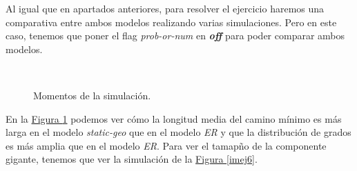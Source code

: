 \documentclass[paper=a4, fontsize=11pt]{article} %
\numberwithin{equation}{section} %
\numberwithin{figure}{section} %
\numberwithin{table}{section} %
\begin{document}
Al igual que en apartados anteriores, para resolver el ejercicio haremos una comparativa entre ambos modelos realizando varias simulaciones. Pero en este caso, tenemos que poner el flag \textit{prob-or-num} en \textbf{\textit{off}} para poder comparar ambos modelos.

\begin{figure}[H]
    \centering
    \mbox{
        \qquad
    }
    \caption{Momentos de la simulación.}
    \label{imej5}
\end{figure}

En la \hyperref[imej5]{Figura \ref{imej5}} podemos ver cómo la longitud media del camino mínimo es más larga en el modelo \textit{static-geo} que en el modelo \textit{ER} y que la distribución de grados es más amplia que en el modelo \textit{ER}. Para ver el tamapño de la componente gigante, tenemos que ver la simulación de la \hyperref[imej6]{Figura \ref*{imej6}}.
\end{document}
